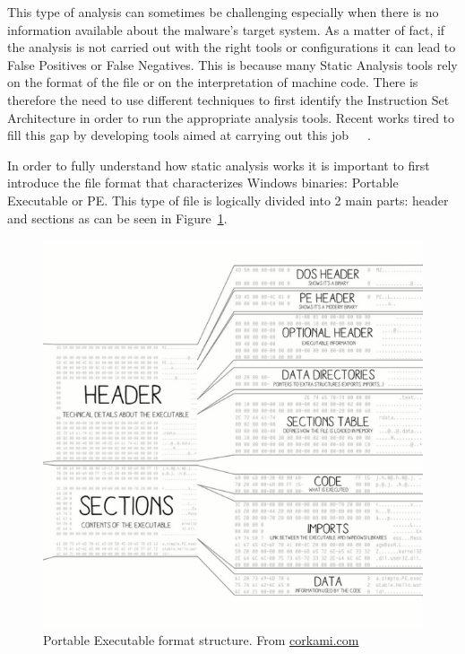 This type of analysis can sometimes be challenging especially when there is no information available about the malware's target system. As a matter of fact, if the analysis is not carried out with the right tools or configurations it can lead to False Positives or False Negatives. This is because many Static Analysis tools rely on the format of the file or on the interpretation of machine code. There is therefore the need to use different techniques to first identify the Instruction Set Architecture in order to run the appropriate analysis tools. Recent works tired to fill this gap by developing tools aimed at carrying out this job~\cite{Nicolao2018ELISAEI}~\cite{kairajarvi2019usable}~\cite{10.1145/3374664.3375742}.

\medskip
In order to fully understand how static analysis works it is important to first introduce the file format that characterizes Windows binaries: Portable Executable or PE. This type of file is logically divided into 2 main parts: header and sections as can be seen in Figure~\ref{fig:pe}.

\begin{figure}[ht]
\centering
\includegraphics[width=\linewidth]{images/pediv.png}
\caption{Portable Executable format structure. From \url{corkami.com}}
\label{fig:pe}
\end{figure}

